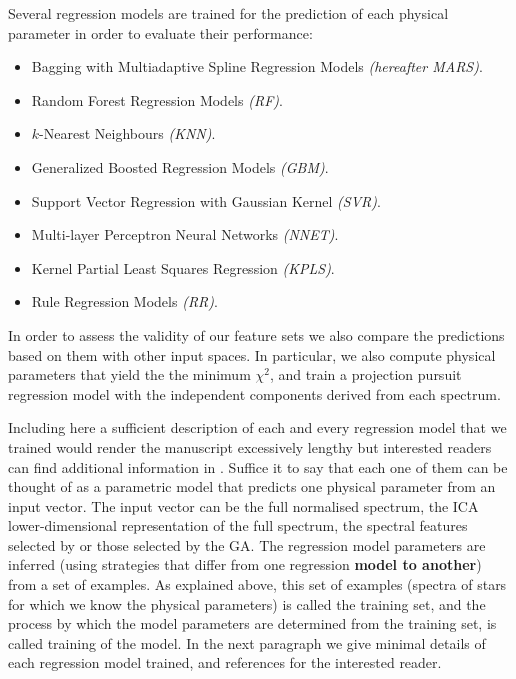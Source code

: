 Several regression models are trained for the prediction of each
physical parameter in order to evaluate their performance:

\begin{itemize}

\item {Bagging with Multiadaptive Spline Regression Models \emph{(hereafter MARS)}.}

\item {Random Forest Regression Models \emph{(RF)}.}

\item {$k$-Nearest Neighbours \emph{(KNN)}.}

\item {Generalized Boosted Regression Models \emph{(GBM)}.}

\item {Support Vector Regression with Gaussian Kernel \emph{(SVR)}.}

\item {Multi-layer Perceptron Neural Networks \emph{(NNET)}.}

\item {Kernel Partial Least Squares Regression \emph{(KPLS)}.}

\item {Rule Regression Models \emph{(RR)}.}

\end{itemize}

In order to assess the validity of our feature sets we also compare
the predictions based on them with other input spaces. In particular,
we also compute physical parameters that yield the the minimum
$\chi^2$, and train a projection pursuit regression model with the
independent components \citep{Hyvarinen:1998:NAD:302528.302606}
derived from each spectrum.

Including here a sufficient description of each and every regression
model that we trained would render the manuscript excessively lengthy
but interested readers can find additional information in
\cite{baraud2002model,geman1992neural,elith2008working,
meyer2003support,svetnik2003random}.  Suffice it to say that each one
of them can be thought of as a parametric model that predicts one
physical parameter from an input vector. The input vector can be the
full normalised spectrum, the ICA lower-dimensional representation of
the full spectrum, the spectral features selected by \cite{cesetti} or
those selected by the GA. The regression model parameters are inferred
(using strategies that differ from one regression {\bf model to
another}) from a set of examples. As explained above, this set of
examples (spectra of stars for which we know the physical parameters)
is called the training set, and the process by which the model
parameters are determined from the training set, is called training of
the model. In the next paragraph we give minimal details of each
regression model trained, and references for the interested reader.

